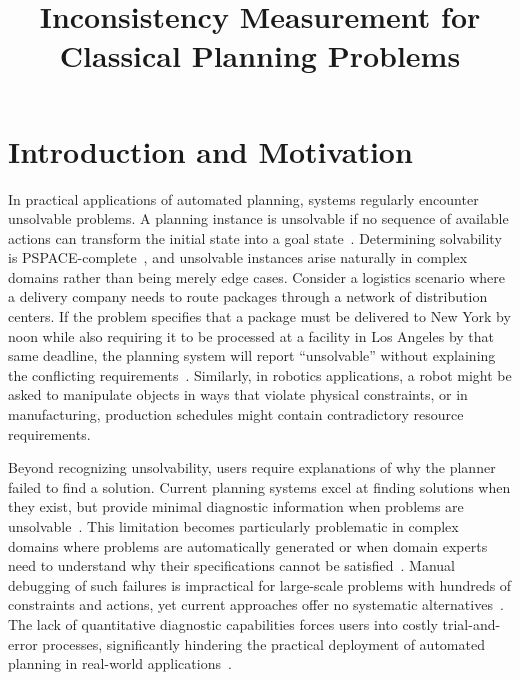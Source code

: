 \documentclass[proposal,english,palatino]{AIGpaper}
\author{\authorname}
\title{Inconsistency Measurement for Classical Planning Problems}
\begin{document}

\maketitle %


\section{Introduction and Motivation}

In practical applications of automated planning, systems regularly encounter unsolvable problems. A planning instance is unsolvable if no sequence of available actions can transform the initial state into a goal state~\cite{Russell2016}. Determining solvability is PSPACE-complete~\cite{Bylander1994}, and unsolvable instances arise naturally in complex domains rather than being merely edge cases. Consider a logistics scenario where a delivery company needs to route packages through a network of distribution centers. If the problem specifies that a package must be delivered to New York by noon while also requiring it to be processed at a facility in Los Angeles by that same deadline, the planning system will report ``unsolvable'' without explaining the conflicting requirements~\cite{Goebelbecker2010,Sreedharan2019}. Similarly, in robotics applications, a robot might be asked to manipulate objects in ways that violate physical constraints, or in manufacturing, production schedules might contain contradictory resource requirements.

Beyond recognizing unsolvability, users require explanations of why the planner failed to find a solution. Current planning systems excel at finding solutions when they exist, but provide minimal diagnostic information when problems are unsolvable~\cite{Eriksson2018,Sreedharan2019}. This limitation becomes particularly problematic in complex domains where problems are automatically generated or when domain experts need to understand why their specifications cannot be satisfied~\cite{Sreedharan2019}. Manual debugging of such failures is impractical for large-scale problems with hundreds of constraints and actions, yet current approaches offer no systematic alternatives~\cite{Goebelbecker2010,Sreedharan2019}. The lack of quantitative diagnostic capabilities forces users into costly trial-and-error processes, significantly hindering the practical deployment of automated planning in real-world applications~\cite{Eriksson2018}.
\end{document}

